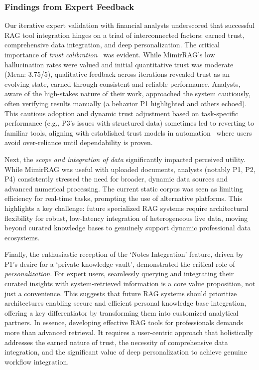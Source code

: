 \documentclass[final,5p,times,twopage,twocolumn,a4paper]{elsarticle}
\begin{document}
\subsubsection{Findings from Expert Feedback}
\label{sec:discussion:expert_validation}
Our iterative expert validation with financial analysts underscored that successful RAG tool integration hinges on a triad of interconnected factors: earned trust, comprehensive data integration, and deep personalization. The critical importance of \textit{trust calibration}~\cite{lee2004trust} was evident. While MimirRAG's low hallucination rates were valued and initial quantitative trust was moderate (Mean: 3.75/5), qualitative feedback across iterations revealed trust as an evolving state, earned through consistent and reliable performance. Analysts, aware of the high-stakes nature of their work, approached the system cautiously, often verifying results manually (a behavior P1 highlighted and others echoed). This cautious adoption and dynamic trust adjustment based on task-specific performance (e.g., P3's issues with structured data) sometimes led to reverting to familiar tools, aligning with established trust models in automation~\cite{lee2004trust,shneiderman2020human} where users avoid over-reliance until dependability is proven.

Next, the \textit{scope and integration of data} significantly impacted perceived utility. While MimirRAG was useful with uploaded documents, analysts (notably P1, P2, P4) consistently stressed the need for broader, dynamic data sources and advanced numerical processing. The current static corpus was seen as limiting efficiency for real-time tasks, prompting the use of alternative platforms. This highlights a key challenge: future specialized RAG systems require architectural flexibility for robust, low-latency integration of heterogeneous live data, moving beyond curated knowledge bases to genuinely support dynamic professional data ecosystems.

Finally, the enthusiastic reception of the `Notes Integration' feature, driven by P1's desire for a `private knowledge vault', demonstrated the critical role of \textit{personalization}. For expert users, seamlessly querying and integrating their curated insights with system-retrieved information is a core value proposition, not just a convenience. This suggests that future RAG systems should prioritize architectures enabling secure and efficient personal knowledge base integration, offering a key differentiator by transforming them into customized analytical partners. In essence, developing effective RAG tools for professionals demands more than advanced retrieval. It requires a user-centric approach that holistically addresses the earned nature of trust, the necessity of comprehensive data integration, and the significant value of deep personalization to achieve genuine workflow integration.
\end{document}
